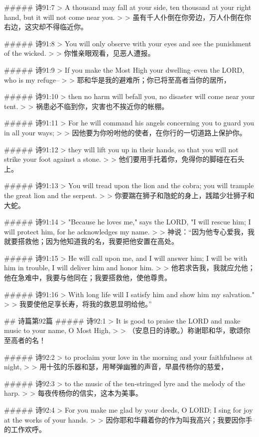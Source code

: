 ##### 诗91:7
> A thousand may fall at your side, ten thousand at your right hand, but it will not come near you.
>
> 虽有千人仆倒在你旁边，万人仆倒在你右边，这灾却不得临近你。


##### 诗91:8
> You will only observe with your eyes and see the punishment of the wicked.
>
> 你惟亲眼观看，见恶人遭报。


##### 诗91:9
> If you make the Most High your dwelling--even the LORD, who is my refuge--
>
> 耶和华是我的避难所；你已将至高者当你的居所，


##### 诗91:10
> then no harm will befall you, no disaster will come near your tent.
>
> 祸患必不临到你，灾害也不挨近你的帐棚。


##### 诗91:11
> For he will command his angels concerning you to guard you in all your ways;
>
> 因他要为你吩咐他的使者，在你行的一切道路上保护你。


##### 诗91:12
> they will lift you up in their hands, so that you will not strike your foot against a stone.
>
> 他们要用手托着你，免得你的脚碰在石头上。


##### 诗91:13
> You will tread upon the lion and the cobra; you will trample the great lion and the serpent.
>
> 你要踹在狮子和虺蛇的身上，践踏少壮狮子和大蛇。


##### 诗91:14
> "Because he loves me," says the LORD, "I will rescue him; I will protect him, for he acknowledges my name.
>
> 神说：“因为他专心爱我，我就要搭救他；因为他知道我的名，我要把他安置在高处。


##### 诗91:15
> He will call upon me, and I will answer him; I will be with him in trouble, I will deliver him and honor him.
>
> 他若求告我，我就应允他；他在急难中，我要与他同在；我要搭救他，使他尊贵。


##### 诗91:16
> With long life will I satisfy him and show him my salvation."
>
> 我要使他足享长寿，将我的救恩显明给他。”


## 诗篇第92篇
##### 诗92:1
> It is good to praise the LORD and make music to your name, O Most High,
>
> （安息日的诗歌。）称谢耶和华，歌颂你至高者的名！


##### 诗92:2
> to proclaim your love in the morning and your faithfulness at night,
>
> 用十弦的乐器和瑟，用琴弹幽雅的声音，早晨传杨你的慈爱，


##### 诗92:3
> to the music of the ten-stringed lyre and the melody of the harp.
>
> 每夜传杨你的信实，这本为美事。


##### 诗92:4
> For you make me glad by your deeds, O LORD; I sing for joy at the works of your hands.
>
> 因你耶和华藉着你的作为叫我高兴；我要因你手的工作欢呼。


